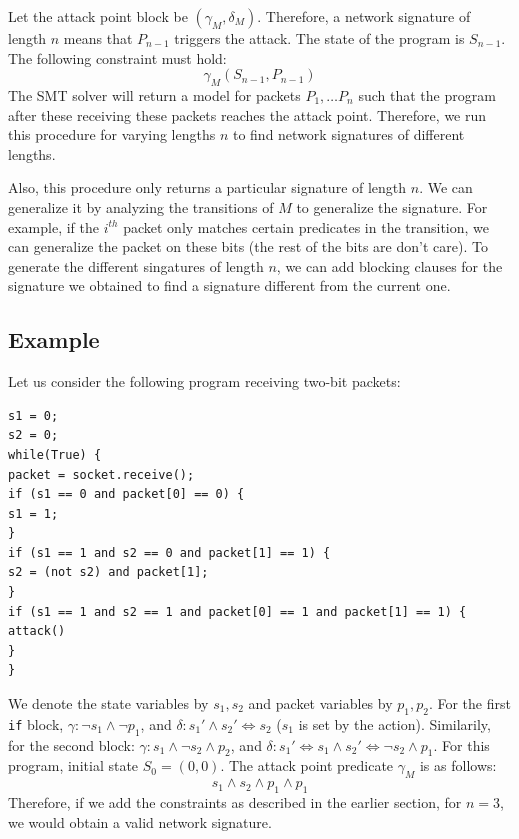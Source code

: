 \documentclass[twocolumn, 11pt]{paper}
\begin{document}
Let the attack point block be $(\gamma_M, \delta_M)$. 
Therefore, a network signature of length $n$ means
that $P_{n-1}$ triggers the attack. The state of the program
is $S_{n-1}$. The following constraint must hold:
\begin{equation}
\gamma_M(S_{n-1},P_{n-1})
\end{equation}
The SMT solver will return a model for packets $P_1,
\ldots P_n$ such that the program after these receiving
these packets reaches the attack point. Therefore, 
we run this procedure for varying lengths $n$ to find
network signatures of different lengths.

Also, this procedure only returns a particular signature
of length $n$. We can generalize it by analyzing the 
transitions of $M$ to generalize the signature. For
example, if the $i^{th}$ packet only matches certain 
predicates in the transition, we can generalize the packet on
these bits (the rest of the bits are don't care). To 
generate the different singatures of length $n$, 
we can add blocking clauses for the signature we obtained 
to find a signature different from the current one.

\subsection{Example}
Let us consider the following program receiving two-bit packets:
\begin{lstlisting}	
s1 = 0;
s2 = 0;
while(True) {
packet = socket.receive();
if (s1 == 0 and packet[0] == 0) {
s1 = 1;
}
if (s1 == 1 and s2 == 0 and packet[1] == 1) {
s2 = (not s2) and packet[1];
}
if (s1 == 1 and s2 == 1 and packet[0] == 1 and packet[1] == 1) {
attack()  
}	
}
\end{lstlisting}	
We denote the state variables by $s_1, s_2$ and packet 
variables by $p_1, p_2$.
For the first \texttt{if} block, 
$\gamma: \neg s_1 \wedge \neg p_1$, and $\delta: s_1' \wedge s_2' \Leftrightarrow s_2$ ($s_1$ 
is set by the action). Similarily,
for the second block: 
$\gamma: s_1 \wedge \neg s_2 \wedge p_2$, and $\delta: 
s_1'\Leftrightarrow s_1 \wedge s_2' \Leftrightarrow \neg s_2 \wedge p_1$.
For this program, initial state $S_0 = (0, 0)$.
The attack point predicate $\gamma_M$ is as follows:
\begin{equation}
s_1 \wedge s_2 \wedge p_1 \wedge p_1
\end{equation}
Therefore, if we add the constraints as described in the 
earlier section, for $n=3$, we would obtain a
valid network signature. 
\end{document}
